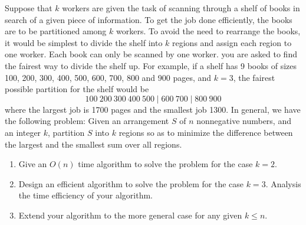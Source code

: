 \begin{Exercise}
Suppose that $k$ workers are given the task of scanning through a shelf of books in search of a given piece of information. To get the job done efficiently, the books are to be partitioned among $k$ workers. To avoid the need to rearrange the books, it would be simplest to divide the shelf into $k$ regions and assign each region to one worker. Each book can only be scanned by one worker. you are asked to find the fairest way to divide the shelf up. For example, if a shelf has 9 books of sizes 100, 200, 300, 400, 500, 600, 700, 800 and 900 pages, and $k = 3$, the fairest possible partition for the shelf would be
\[ 100~200~300~400~500 \mid 600~700 \mid 800~900 \]
where the largest job is 1700 pages and the smallest job 1300. In general, we have the following problem: Given an arrangement $S$ of $n$ nonnegative numbers, and an integer $k$, partition $S$ into $k$ regions so as to minimize the difference between the largest and the smallest sum over all regions.

\begin{enumerate}
\item Give an $O(n)$ time algorithm to solve the problem for the case $k = 2$.
\item Design an efficient algorithm to solve the problem for the case $k = 3$. Analysis the time efficiency of your algorithm.
\item Extend your algorithm to the more general case for any given $k \leq n$. 
\end{enumerate}
\end{Exercise}
\begin{Answer}
\end{Answer}

\printbibliography[heading=subbibliography]

